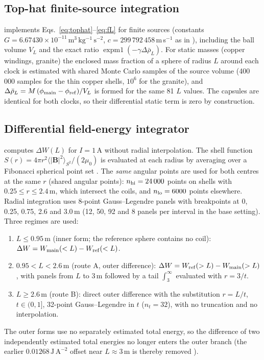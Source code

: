 \documentclass[12pt,a4paper]{article}
\newcommand{\rhob}{\bar\rho_L}
\begin{document}
\subsection{Top-hat finite-source integration}\label{sec:tophat}
 implements Eqs.~\eqref{eq:tophat}--\eqref{eq:fL} for finite sources
(constants $G=6.67430\times10^{-11}\,\mathrm{m^3\,kg^{-1}\,s^{-2}}$, $c=299\,792\,458$\,m\,s$^{-1}$ as
in \cite{TAL_formalism}), including the ball volume $V_L$ and the exact ratio
$\operatorname{expm1}(-\gamma\Delta\rhob)$. For static masses (copper windings, granite) the enclosed mass
fraction of a sphere of radius $L$ around each clock is estimated with shared Monte Carlo samples of the
source volume (400\,000 samples for the thin copper shells, $10^6$ for the granite), and
$\Delta\rhob=M\,(\phi_{\rm main}-\phi_{\rm ref})/V_L$ is formed for the same 81 $L$ values. The capsules are
identical for both clocks, so their differential static term is zero by construction.

\subsection{Differential field-energy integrator}\label{sec:integrator}
 computes $\Delta W(L)$ for $I=1$\,A without radial interpolation.
The shell function $S(r)=4\pi r^2\langle|\mathbf B|^2\rangle_{S^2}/(2\mu_0)$ is evaluated at each radius
by averaging over a Fibonacci spherical point set \cite{Gonzalez2010}. The \emph{same} angular points are
used for both centres at the same $r$ (shared angular points): $n_{\rm hi}=24\,000$ points on shells with
$0.25\le r\le2.4$\,m, which intersect the coils, and $n_{\rm lo}=6000$ points elsewhere. Radial integration
uses 8-point Gauss--Legendre panels with breakpoints at 0, 0.25, 0.75, 2.6 and 3.0\,m (12, 50, 92 and
8 panels per interval in the base setting). Three regimes are used:
\begin{enumerate}
\item $L\le0.95$\,m (inner form; the reference sphere contains no coil):
$\Delta W=W_{\rm main}(<L)-W_{\rm ref}(<L)$.
\item $0.95<L<2.6$\,m (route A, outer difference):
$\Delta W=W_{\rm ref}(>L)-W_{\rm main}(>L)$, with panels from $L$ to 3\,m followed by a tail
$\int_3^\infty$ evaluated with $r=3/t$.
\item $L\ge2.6$\,m (route B): direct outer difference with the substitution $r=L/t$, $t\in(0,1]$,
32-point Gauss--Legendre in $t$ ($n_t=32$), with no truncation and no interpolation.
\end{enumerate}
The outer forms use no separately estimated total energy, so the difference of two independently estimated
total energies no longer enters the outer branch (the earlier $0.01268\,\mathrm{J\,A^{-2}}$ offset near
$L\approx3$\,m is thereby removed \cite{TAL_V20}).
\end{document}
